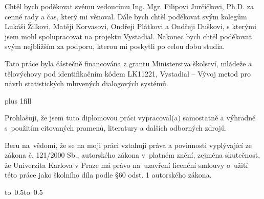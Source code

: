 \documentclass[12pt,a4paper]{report}
\let\openright=\clearpage
\begin{document}
\newpage



\openright

\noindent
Chtěl bych poděkovat svému vedoucímu Ing. Mgr. Filipovi Jurčíčkovi, Ph.D. za cenné rady a čas, který mi věnoval. 
Dále bych chtěl poděkovat svým kolegům Lukáši Žilkovi, Matěji Korvasovi, Ondřeji Plátkovi a Ondřeji Duškovi, s kterými jsem mohl spolupracovat na projektu Vystadial.
Nakonec bych chtěl poděkovat svým nejbližším za podporu, kterou mi poskytli po celou dobu studia.

Tato práce byla částečně financována z grantu Ministerstva školství, mládeže a tělovýchovy pod identifikačním kódem LK11221, Vystadial -- Vývoj metod pro návrh statistických mluvených dialogových systémů.

\newpage


\vglue 0pt plus 1fill

\noindent
Prohlašuji, že jsem tuto diplomovou práci vypracoval(a) samostatně a výhradně
s~použitím citovaných pramenů, literatury a dalších odborných zdrojů.

\medskip\noindent
Beru na~vědomí, že se na moji práci vztahují práva a povinnosti vyplývající
ze zákona č. 121/2000 Sb., autorského zákona v~platném znění, zejména skutečnost,
že Univerzita Karlova v Praze má právo na~uzavření licenční smlouvy o~užití této
práce jako školního díla podle §60 odst. 1 autorského zákona.

\vspace{10mm}

\hbox{\hbox to 0.5\hbox to 0.5}

\vspace{20mm}
\newpage

\end{document}
